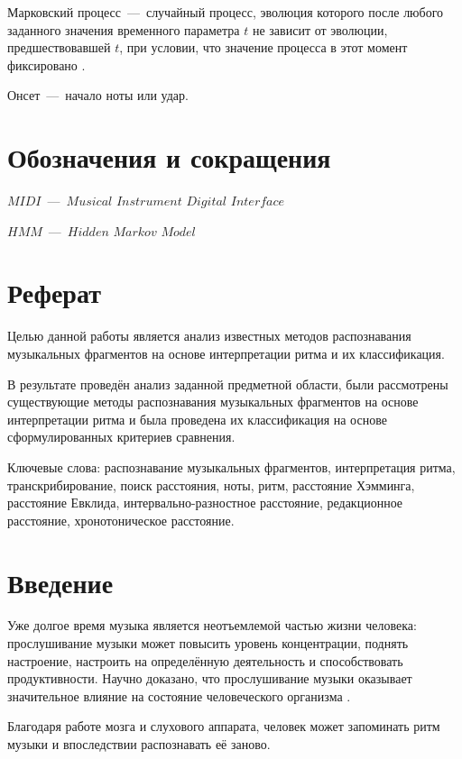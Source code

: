 Марковский процесс~---~случайный процесс, эволюция которого после любого заданного значения временного параметра $t$ не зависит от эволюции, предшествовавшей $t$, при условии, что значение процесса в этот момент фиксировано \cite{bib19}. 

Онсет~---~начало ноты или удар.

\chapter*{Обозначения и сокращения}

$MIDI$~---~$Musical$ $Instrument$ $Digital$ $Interface$

$HMM$~---~$Hidden$ $Markov$ $Model$

\chapter*{Реферат}

Целью данной работы является анализ известных методов распознавания музыкальных фрагментов на основе интерпретации ритма и их классификация.

В результате проведён анализ заданной предметной области, были рассмотрены существующие методы распознавания музыкальных фрагментов на основе интерпретации ритма и была проведена их классификация на основе сформулированных критериев сравнения.

Ключевые слова: распознавание музыкальных фрагментов, интерпретация ритма, транскрибирование, поиск расстояния, ноты, ритм, расстояние Хэмминга, расстояние Евклида, интервально-разностное расстояние, редакционное расстояние, хронотоническое расстояние.

\newpage

\chapter*{Введение}

Уже долгое время музыка является неотъемлемой частью жизни человека: прослушивание музыки может повысить уровень концентрации, поднять настроение, настроить на определённую деятельность и способствовать продуктивности. Научно доказано, что прослушивание музыки оказывает значительное влияние на состояние человеческого организма \cite{bib1}.

Благодаря работе мозга и слухового аппарата, человек может запоминать ритм музыки и впоследствии распознавать её заново. 

